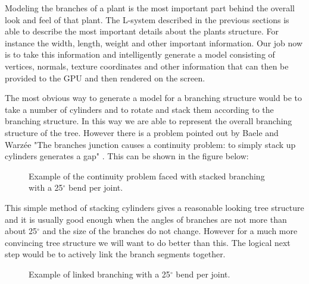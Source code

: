 \begin{flushleft}

Modeling the branches of a plant is the most important part behind the overall look and feel of that plant. The L-system described in the previous sections is able to describe the most important details about the plants structure. For instance the width, length, weight and other important information. Our job now is to take this information and intelligently generate a model consisting of vertices, normals, texture coordinates and other information that can then be provided to the GPU and then rendered on the screen.\\

\vspace{5mm}

The most obvious way to generate a model for a branching structure would be to take a number of cylinders and to rotate and stack them according to the branching structure. In this way we are able to represent the overall branching structure of the tree. However there is a problem pointed out by Baele and Warz\'{e}e "The branches junction causes a continuity problem: to simply stack up cylinders generates a gap" \cite{baele2005real}. This can be shown in the figure below:

\FloatBarrier

\begin{figure}[htbp]
	{\centering
		\vspace{7px}
		\setlength{\fboxrule}{1pt}
		\caption{Example of the continuity problem faced with stacked branching with a 25$^{\circ}$ bend per joint.}
	}
\end{figure}

\FloatBarrier

\vspace{5mm}


\vspace{5mm}

This simple method of stacking cylinders gives a reasonable looking tree structure and it is usually good enough when the angles of branches are not more than about 25$^{\circ}$ and the size of the branches do not change. However for a much more convincing tree structure we will want to do better than this. The logical next step would be to actively link the branch segments together.

\FloatBarrier

\begin{figure}[htbp]
	{\centering
		\vspace{7px}
		\setlength{\fboxrule}{1pt}
		\caption{Example of linked branching with a 25$^{\circ}$ bend per joint.}
	}
\end{figure}

\FloatBarrier

\end{flushleft}